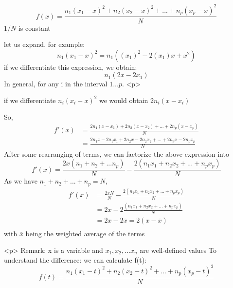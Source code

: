 $$
f(x)=\frac{n_1(x_1-x)^2 +n_2(x_2-x)^2 + ... + n_p (x_p - x)^2}{N}
$$
$1/N$ is constant

let us expand, for example:
$$
n_1(x_1 - x)^2
=n_1((x_1)^2 - 2(x_1)x + x^2)
$$
if we differentiate this expression, we obtain:
$$
n_1(2x - 2x_1)
$$
In general, for any i in the interval $1...p$.
<p>

if we differentiate $n_i(x_i - x)^2$ we would obtain  $2n_i(x - x_i)$

So, 
$$\begin{aligned}
f'(x) &= \frac{2n_1(x-x_1) + 2n_2(x-x_2) + ... + 2n_p(x-x_p)}{N}\\
&= \frac{2n_1x-2n_1x_1 + 2n_2x-2n_2x_2 + ... + 2n_px-2n_px_p}{N}
\end{aligned}
$$
After some rearranging of terms, we can factorize the above expression into
$$
f'(x) = \frac{2x(n_1+n_2+...n_p)}{N} -\frac{2(n_1 x_1+n_2 x_2+...+n_p x_p)}{N}
$$
As we have $n_1 + n_2 + ... + n_p = N$,
$$\begin{aligned}
f'(x) &= \frac{2xN}{N} -\frac{2(n_1 x_1+n_2 x_2+...+n_p x_p)}{N}\\
 &= 2x - 2\frac{(n_1 x_1+n_2 x_2+...+n_p x_p)}{N}\\
 &= 2x - 2\overline{x} = 2(x - \overline{x})\\
\end{aligned}
$$
with $\overline{x}$ being the weighted average of the terms

<p>
Remark:
x is a variable and $x_1, x_2, ... x_n$ are well-defined values
To understand the difference:
we can calculate f(t):
$$
f(t)=\frac{n_1(x_1-t)^2 +n_2(x_2-t)^2 + ... + n_p (x_p - t)^2}{N}
$$
